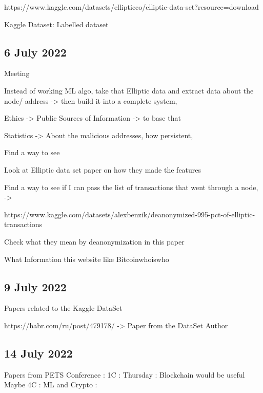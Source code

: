 \documentclass{article}
\begin{document}
        https://www.kaggle.com/datasets/ellipticco/elliptic-data-set?resource=download
        
        Kaggle Dataset: Labelled dataset

    \subsection{6 July 2022}
       
        Meeting
            
            Instead of working ML algo, take that Elliptic data and extract data about the node/ address -> then build it into a complete system, 
            
            Ethics -> Public Sources of Information -> to base that 
            
            Statistics -> About the malicious addresses, how persistent, 
            
            Find a way to see 
            
            Look at Elliptic data set paper on how they made the features
            
            Find a way to see if I can pass the list of transactions that went through a node, -> 
            
            https://www.kaggle.com/datasets/alexbenzik/deanonymized-995-pct-of-elliptic-transactions
            
            Check what they mean by deanonymization in this paper ^^^
            
            What Information this website like Bitcoinwhoiswho
            


    \subsection{9 July 2022}
        
        Papers related to the Kaggle DataSet
        
        https://habr.com/ru/post/479178/ -> Paper from the DataSet Author
        
    \subsection{14 July 2022}
        
        Papers from PETS Conference : 1C : Thursday : Blockchain would be useful
        Maybe 4C : ML and Crypto : 
        
\end{document}
